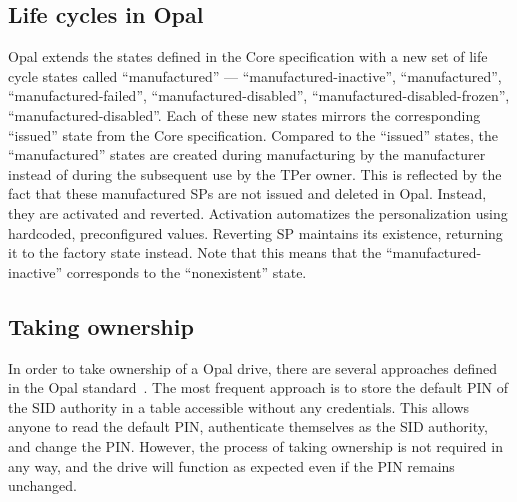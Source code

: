 \subsection{Life cycles in Opal}

Opal extends the states defined in the Core specification with a new set of life cycle states called ``manufactured'' --- ``manufactured-inactive'', ``manufactured'', ``manufactured-failed'', ``manufactured-disabled'', ``manufactured-disabled-frozen'', ``manufactured-disabled''. Each of these new states mirrors the corresponding ``issued'' state from the Core specification. Compared to the ``issued'' states, the ``manufactured'' states are created during manufacturing by the manufacturer instead of during the subsequent use by the TPer owner. This is reflected by the fact that these manufactured SPs are not issued and deleted in Opal. Instead, they are activated and reverted. Activation automatizes the personalization using hardcoded, preconfigured values. Reverting SP maintains its existence, returning it to the factory state instead. Note that this means that the ``manufactured-inactive'' corresponds to the ``nonexistent'' state.

\subsection{Taking ownership}


In order to take ownership of a Opal drive, there are several approaches defined in the Opal standard~\cite{tcg-opal2}. The most frequent approach is to store the default PIN of the SID authority in a table accessible without any credentials. This allows anyone to read the default PIN, authenticate themselves as the SID authority, and change the PIN. However, the process of taking ownership is not required in any way, and the drive will function as expected even if the PIN remains unchanged.



